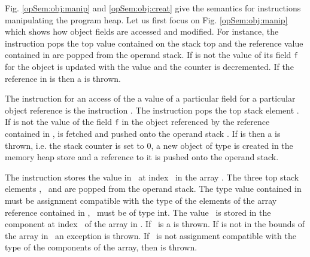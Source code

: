 \begin{figure}[ht!]
\end{figure}
\clearpage

Fig. \ref{opSem:obj:manip} and \ref{opSem:obj:creat}  give the semantics for instructions manipulating the program heap.
Let us first focus on Fig. \ref{opSem:obj:manip} which shows how object fields are accessed and modified.  
For instance, the instruction \putfield pops the top value contained on the stack top \stackOnlyParam{\counterOnly} 
and the reference value contained in  
	are popped from the operand stack. If  is not \Mynull{} 
the value of its field 	\texttt{f} for the object  is updated with the value\stackOnlyParam{\counterOnly} and
 the counter \counterOnly{} is decremented. If the reference in  is \Mynull{} then a \NullPointerExc{} is thrown. 

The instruction for an access of the a value of a particular field for a particular object reference is the 
instruction \getfield. The instruction pops the  
 top stack element \stackOnlyParam{\counterOnly}.
 If \stackOnlyParam{\counterOnly} is not \Mynull{} the value of the field \texttt{f}
in the object referenced by the reference contained in \stackOnlyParam{\counterOnly}, is fetched and pushed onto the operand stack \stackOnlyParam{\counterOnly}.
If \stackOnlyParam{\counterOnly} is \Mynull{} then a \NullPointerExc{} is thrown, i.e. the stack counter is set to 0, a new object of type
\NullPointerExc{} is created in the memory heap store \heap{} and a reference to it is pushed onto the operand stack.

The instruction \arrstore{} stores the value in \stackOnlyParam{\counterOnly} \ at index  \ in 
 the array  . 
The three top stack elements \stackOnlyParam{\counterOnly},  \  and  
are popped from the operand stack. The type value contained in \stackOnlyParam{\counterOnly} must be assignment 
compatible with the type
of the elements of the array reference contained in ,   \  must be of type int. 
The value \stackOnlyParam{\counterOnly} \ is stored in the component at index  \  of the array  in  .
If  \ is \Mynull{} a \NullPointerExc{} is thrown. If    is not in the bounds of the array 
in   \ an \ArrIndexOutOfBoundExc{} exception is thrown. If \stackOnlyParam{\counterOnly} \ is not assignment 
compatible with the type of the components of the array, then \ArrStoreExc{}  is thrown.

